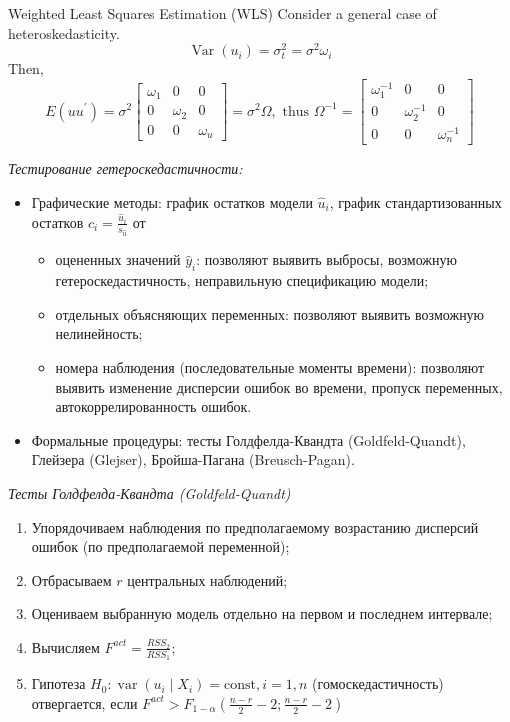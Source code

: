 \documentclass[a4paper,8pt]{article} %
\begin{document}
Weighted Least Squares Estimation (WLS)
Consider a general case of heteroskedasticity.
$$
\operatorname{Var}\left(u_{i}\right)=\sigma_{t}^{2}=\sigma^{2} \omega_{i}
$$
Then,
$$
E\left(u u^{\prime}\right)=\sigma^{2}\left[\begin{array}{ccc}
\omega_{1} & 0 & 0 \\
0 & \omega_{2} & 0 \\
0 & 0 & \omega_{u}
\end{array}\right]=\sigma^{2} \Omega, \text { thus } \Omega^{-1}=\left[\begin{array}{ccc}
\omega_{1}^{-1} & 0 & 0 \\
0 & \omega_{2}^{-1} & 0 \\
0 & 0 & \omega_{n}^{-1}
\end{array}\right]
$$


\textit{Тестирование гетероскедастичности: }

\begin{itemize}
	\item Графические методы: график остатков модели $\hat{u}_{i}$, 
	график стандартизованных остатков $c_{i}=\frac{\widehat{u}_{i}}{s_{\widehat{u}}}$
	от 
	\begin{itemize}
		\item 	оцененных значений $\hat{y}_{i}$: позволяют выявить выбросы, возможную гетероскедастичность, неправильную спецификацию модели;
		\item  отдельных объясняющих переменных: позволяют выявить возможную нелинейность;
		\item  номера наблюдения (последовательные моменты времени):  позволяют выявить изменение дисперсии ошибок во времени, пропуск переменных, автокоррелированность ошибок.
	\end{itemize}
	\item Формальные процедуры: тесты  Голдфелда-Квандта (Goldfeld-Quandt),  Глейзера  (Glejser),  Бройша-Пагана  (Breusch-Pagan).  
\end{itemize}

\textit{Тесты  Голдфелда-Квандта (Goldfeld-Quandt) }

\begin{enumerate}
	\item Упорядочиваем наблюдения по предполагаемому возрастанию дисперсий ошибок (по предполагаемой переменной);
	\item  Отбрасываем $r$ центральных наблюдений;
	\item  Оцениваем выбранную модель отдельно на первом и последнем интервале;
	\item  Вычисляем $F^{a c t}=\frac{R S S_{2}}{R S S_{1}} ;$
	\item  Гипотеза
	$H_{0}: \operatorname{var}\left(u_{i} \mid X_{i}\right)=\mathrm{const}, i=1, n$ (гомоскедастичность)
	отвергается, если $F^{a c t}>F_{1-\alpha}\left(\frac{n-r}{2}-2 ; \frac{n-r}{2}-2\right)$
\end{enumerate}
\end{document}
